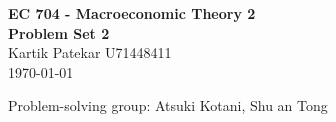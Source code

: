 \documentclass[11pt]{article}
\newcommand{\hmwkTitle}{Problem Set 2}
\newcommand{\hmwkDueDate}{\today}
\newcommand{\hmwkClass}{EC 704 - Macroeconomic Theory 2}
\newcommand{\hmwkAuthorName}{Kartik Patekar U71448411}
\begin{document}
\setlength{\parindent}{0pt}

\begin{center}
  \textbf{\Large \hmwkClass}\\
  \textbf{\hmwkTitle}\\
  \hmwkAuthorName \\
  \hmwkDueDate
\end{center}

Problem-solving group: Atsuki Kotani, Shu an Tong



\pagebreak
{}



\pagebreak
{}



\end{document}
